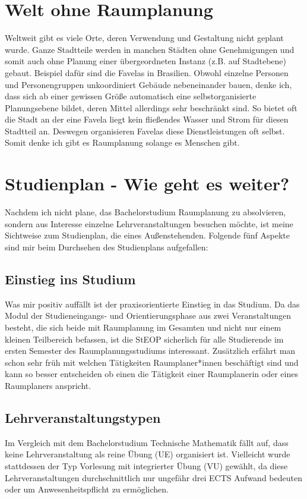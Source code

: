 \documentclass[]{article}
\begin{document}
\section{Welt ohne Raumplanung}
Weltweit gibt es viele Orte, deren Verwendung und Gestaltung nicht geplant wurde. Ganze Stadtteile werden in manchen Städten ohne Genehmigungen und somit auch ohne Planung einer übergeordneten Instanz (z.B. auf Stadtebene) gebaut. Beispiel dafür sind die Favelas in Brasilien. Obwohl einzelne Personen und Personengruppen unkoordiniert Gebäude nebeneinander bauen, denke ich, dass sich ab einer gewissen Größe automatisch eine selbstorganisierte Planungsebene bildet, deren Mittel allerdings sehr beschränkt sind. So bietet oft die Stadt an der eine Favela liegt kein fließendes Wasser und Strom für diesen Stadtteil an. Deswegen organisieren Favelas diese Dienstleistungen oft selbst. Somit denke ich gibt es Raumplanung solange es Menschen gibt.

\section{Studienplan - Wie geht es weiter?}
Nachdem ich nicht plane, das Bachelorstudium Raumplanung zu absolvieren, sondern aus Interesse einzelne Lehrveranstaltungen besuchen möchte, ist meine Sichtweise zum Studienplan, die eines Außenstehenden. Folgende fünf Aspekte sind mir beim Durchsehen des Studienplans aufgefallen:

\subsection{Einstieg ins Studium}
Was mir positiv auffällt ist der praxisorientierte Einstieg in das Studium. Da das Modul der Studieneingangs- und Orientierungsphase aus zwei Veranstaltungen besteht, die sich beide mit Raumplanung im Gesamten und nicht nur einem kleinen Teilbereich befassen, ist die StEOP sicherlich für alle Studierende im ersten Semester des Raumplanungsstudiums interessant. Zusätzlich erfährt man schon sehr früh mit welchen Tätigkeiten Raumplaner*innen beschäftigt sind und kann so besser entscheiden ob einen die Tätigkeit einer Raumplanerin oder eines Raumplaners anspricht.

\subsection{Lehrveranstaltungstypen}
Im Vergleich mit dem Bachelorstudium Technische Mathematik fällt auf, dass keine Lehrveranstaltung als reine Übung (UE) organisiert ist. Vielleicht wurde stattdessen der Typ Vorlesung mit integrierter Übung (VU) gewählt, da diese Lehrveranstaltungen durchschnittlich nur ungefähr drei ECTS Aufwand bedeuten oder um Anwesenheitspflicht zu ermöglichen.
\end{document}
